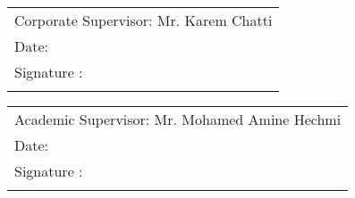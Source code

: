 





\begin{tabular}{|p{15cm}|}
\hline
Corporate Supervisor: Mr. Karem Chatti\\
\vspace{0.5cm} %
Date:\\
\vspace{0.5cm} %
Signature :\\
\vspace{5cm} %
\hline
\end{tabular}

\vspace{1cm} %

\begin{tabular}{|p{15cm}|}
\hline
Academic Supervisor: Mr. Mohamed Amine Hechmi\\
\vspace{0.5cm} %
Date:\\
\vspace{0.5cm} %
Signature :\\
\vspace{5cm} %
\hline
\end{tabular}
